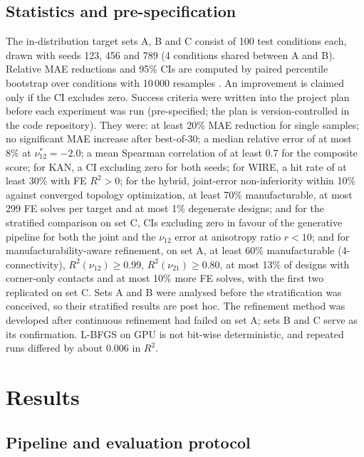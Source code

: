\documentclass[a4paper,11pt]{article}
\newcommand{\nuot}{\nu_{12}}
\newcommand{\nuto}{\nu_{21}}
\newcommand{\RR}{R^2}
\begin{document}
\subsection{Statistics and pre-specification}
\label{sec:stats}
The in-distribution target sets A, B and C consist of 100 test conditions
each, drawn with seeds 123, 456 and 789 (4 conditions shared between A and
B). Relative MAE reductions and 95\% CIs are computed by paired percentile
bootstrap over conditions with 10\,000 resamples
\citep{efron1993bootstrap}. An improvement is claimed only if the CI excludes
zero. Success criteria were written into the project plan before each
experiment was run (pre-specified; the plan is version-controlled in the
code repository). They were: at least 20\% MAE reduction for single samples;
no significant MAE increase after best-of-30; a median relative error of at
most 8\% at $\nuot^{*}=-2.0$; a mean Spearman correlation of at least 0.7
for the composite score; for KAN, a CI excluding zero for both seeds; for
WIRE, a hit rate of at least 30\% with FE $\RR>0$; for the hybrid,
joint-error non-inferiority within 10\% against converged topology
optimization, at least 70\% manufacturable, at most 299 FE solves per
target and at most 1\% degenerate designs; and for the stratified comparison
on set C, CIs excluding zero in favour of the generative pipeline for both
the joint and the $\nuot$ error at anisotropy ratio $r<10$; and for
manufacturability-aware refinement, on set A, at least 60\% manufacturable
(4-connectivity), $\RR(\nuot)\ge0.99$, $\RR(\nuto)\ge0.80$, at most 13\%
of designs with corner-only contacts and at most 10\% more FE solves, with
the first two replicated on set C. Sets A and B
were analysed before the stratification was conceived, so their stratified
results are post hoc. The refinement method was developed after
continuous refinement had failed on set A; sets B and C serve as its
confirmation. L-BFGS on GPU is not bit-wise deterministic, and repeated
runs differed by about 0.006 in $\RR$.

\section{Results}

\subsection{Pipeline and evaluation protocol}
\end{document}
